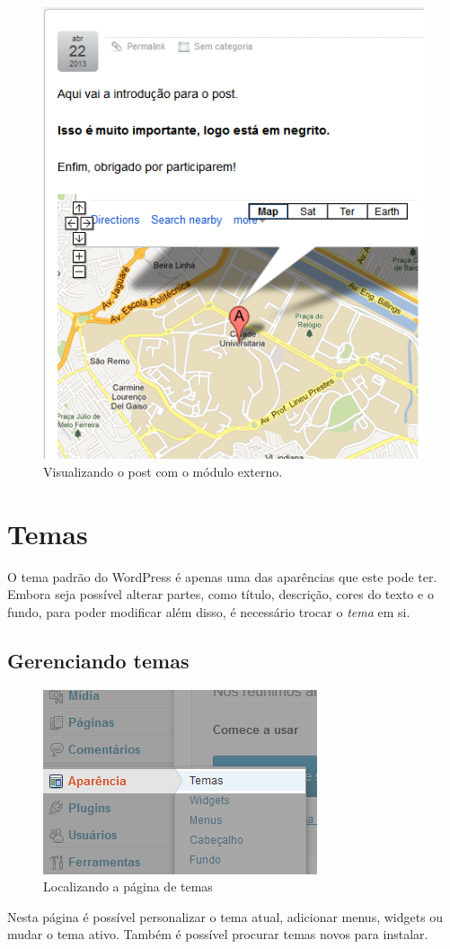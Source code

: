 \documentclass[12pt,onecolumn]{article}
\begin{document}
\begin{enumerate}
\begin{figure}[H]
						\includegraphics{html5.png}
						\caption{Visualizando o post com o módulo externo.}
					\end{figure}
			\end{enumerate}

\section{Temas}
	O tema padrão do WordPress é apenas uma das aparências que este pode ter. Embora
	seja possível alterar partes, como título, descrição, cores do texto e o fundo, para poder
	modificar além disso, é necessário trocar o \textit{tema} em si.
	
	
	\subsection{Gerenciando temas}
		\begin{figure}[H]
			\centering
			\includegraphics{tema1.png}
			\caption{Localizando a página de temas}
		\end{figure}
		Nesta página é possível personalizar o tema atual, adicionar menus, widgets
		ou mudar o tema ativo. Também é possível procurar temas novos para instalar.
		
\end{document}
